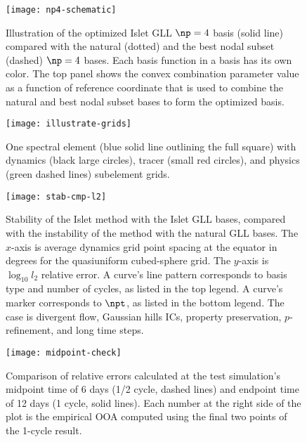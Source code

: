 \begin{figure}[tbh]
  \centering
  \texttt{[image: np4-schematic]}
  \caption{
  Illustration of the optimized Islet GLL $\np=4$ basis (solid line) compared with
  the natural (dotted) and the best nodal subset (dashed) $\np=4$ bases.
  Each basis function in a basis has its own color.
  The top panel shows the convex combination parameter value as a function of reference coordinate
  that is used to combine the natural and best nodal subset bases
  to form the optimized basis.
  }
  \label{fig:np4-schematic}
\end{figure}

\begin{figure}[tbh]
  \centering
  \texttt{[image: illustrate-grids]}
  \caption{
    One spectral element (blue solid line outlining the full square) with
    dynamics (black large circles), tracer (small red circles), and physics (green dashed lines) subelement grids.
  }
  \label{fig:illustrate-grids}
\end{figure}

\begin{figure}[tbh]
  \centering
  \texttt{[image: stab-cmp-l2]}
  \caption{
    Stability of the Islet method with the Islet GLL bases,
    compared with the instability of the method with the natural GLL bases.
    The $x$-axis is average dynamics grid point spacing at the equator in degrees for the quasiuniform cubed-sphere grid.
    The $y$-axis is $\log_{10} l_2$ relative error.
    A curve's line pattern corresponds to basis type and number of cycles, as listed in the top legend.
    A curve's marker corresponds to $\npt$, as listed in the bottom legend.
    The case is divergent flow, Gaussian hills ICs, property preservation, $p$-refinement, and long time steps.
  }
  \label{fig:islet-vs-gll}
\end{figure}

\begin{figure}[tbh]
  \centering
  \texttt{[image: midpoint-check]}
  \caption{
    Comparison of relative errors calculated at the test simulation's midpoint time of 6 days (1/2 cycle, dashed lines)
    and endpoint time of 12 days (1 cycle, solid lines).
    Each number at the right side of the plot is the empirical OOA computed using the final two points of the 1-cycle result.
  }
  \label{fig:traj-interp}
\end{figure}

